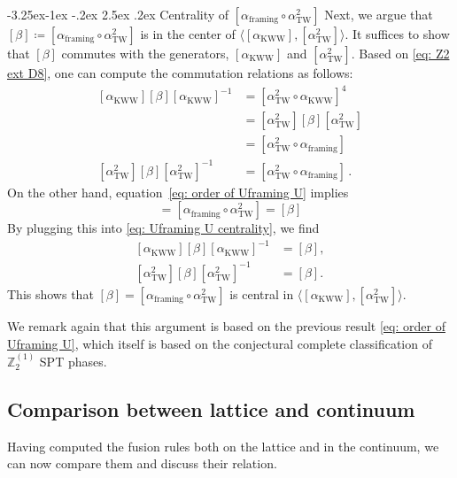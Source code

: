 \documentclass[aps,twocolumn,prx,floatfix,preprintnumbers, nofootinbib,10pt]{revtex4-2}
\makeatletter
\numberwithin{equation}{section}
\theoremstyle{definition}
\theoremstyle{remark}
\theoremstyle{claim}
\newcommand{\be}{\begin{equation}}
\newcommand{\ee}{\end{equation}}
\newcommand{\aKWW}{\alpha_\text{KWW}}
\newcommand{\aTW}{\alpha_\text{TW}}
\newcommand{\Z}{{\mathbb Z}}
\renewcommand\subsubsection{\@startsection{subsubsection}{3}{\z@}%
                                     {-3.25ex\@plus -1ex \@minus -.2ex}%
                                     {2.5ex \@plus .2ex}%
                                     {\centering\itshape\bfseries\small}}
\makeatother
\begin{document}
\subsubsection{Centrality of $[\alpha_{\text{framing}} \circ \aTW^2]$}
Next, we argue that $[\beta] \coloneqq [\alpha_{\text{framing}} \circ \aTW^2]$ is in the center of $\langle [\aKWW], [\aTW^2] \rangle$.
It suffices to show that $[\beta]$ commutes with the generators, $[\aKWW]$ and $[\aTW^2]$.
Based on \eqref{eq: Z2 ext D8}, one can compute the commutation relations as follows:
\begin{equation}\label{eq: Uframing U centrality}
 \begin{aligned}
  [\aKWW] [\beta] [\aKWW]^{-1} &= [\aTW^2 \circ \aKWW]^4 \\
  &= [\aTW^2] [\beta] [\aTW^2] \\
  &= [\aTW^2 \circ \alpha_\text{framing}] \\
  [\aTW^2] [\beta] [\aTW^2]^{-1} &= [\aTW^2 \circ \alpha_\text{framing}] \,.
 \end{aligned}
\end{equation}
On the other hand, equation~\eqref{eq: order of Uframing U} implies
\be
[\aTW^2 \circ \alpha_\text{framing}] = [\alpha_{\text{framing}} \circ \aTW^2] = [\beta]
\ee
By plugging this into \eqref{eq: Uframing U centrality}, we find
\begin{equation}
\begin{aligned}
[\aKWW] [\beta] [\aKWW]^{-1} &= [\beta], \\
[\aTW^2] [\beta] [\aTW^2]^{-1} &= [\beta].
\end{aligned}
\end{equation}
This shows that $[\beta] = [\alpha_{\text{framing}} \circ \aTW^2]$ is central in $\langle [\aKWW], [\aTW^2] \rangle$.

We remark again that this argument is based on the previous result \eqref{eq: order of Uframing U}, which itself is based on the conjectural complete classification of $\Z_2^{(1)}$ SPT phases.

\subsection{Comparison between lattice and continuum}
\label{sec: comparison Z2}
Having computed the fusion rules both on the lattice and in the continuum, we can now compare them and discuss their relation.
\end{document}
